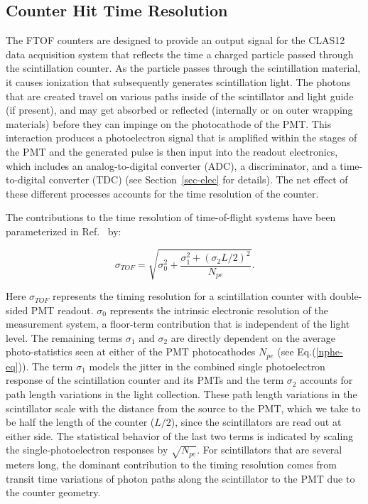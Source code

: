\documentclass[3p,times,twocolumn]{elsarticle}
\begin{document}
\subsection{Counter Hit Time Resolution}
\label{res-sec}

The FTOF counters are designed to provide an output signal for the CLAS12 data acquisition system
\cite{daq-nim} that reflects the time a charged particle passed through the scintillation counter. As the
particle passes through the scintillation material, it causes ionization that subsequently generates
scintillation light. The photons that are created travel on various paths inside of the scintillator and light
guide (if present), and may get absorbed or reflected (internally or on outer wrapping materials) before
they can impinge on the photocathode of the PMT. This interaction produces a photoelectron signal that is
amplified within the stages of the PMT and the generated pulse is then input into the readout electronics,
which includes an analog-to-digital converter (ADC), a discriminator, and a time-to-digital converter (TDC)
(see Section~\ref{sec-elec} for details). The net effect of these different processes accounts for the time
resolution of the counter.

The contributions to the time resolution of time-of-flight systems have been parameterized in
Ref.~\cite{kuhlen} by:

\begin{equation}
\label{timing-func}
\sigma_{TOF} = \sqrt{\sigma_0^2 + \frac{\sigma_1^2 + (\sigma_2 L/2)^2} {N_{pe}}}.
\end{equation}

\noindent
Here $\sigma_{TOF}$ represents the timing resolution for a scintillation counter with double-sided PMT
readout. $\sigma_0$ represents the intrinsic electronic resolution of the measurement system, a
floor-term contribution that is independent of the light level. The remaining terms $\sigma_1$ and
$\sigma_2$ are directly dependent on the average photo-statistics seen at either of the PMT
photocathodes $N_{pe}$ (see Eq.(\ref{nphe-eq})). The term $\sigma_1$ models the jitter in the combined
single photoelectron response of the scintillation counter and its PMTs and the term $\sigma_2$ accounts
for path length variations in the light collection.  These path length variations in the scintillator scale with
the distance from the source to the PMT, which we take to be half the length of the counter ($L/2$), since
the scintillators are read out at either side.  The statistical behavior of the last two terms is indicated by
scaling the single-photoelectron responses by $\sqrt{N_{pe}}$. For scintillators that are several meters
long, the dominant contribution to the timing resolution comes from transit time variations of photon paths
along the scintillator to the PMT due to the counter geometry.
\end{document}

